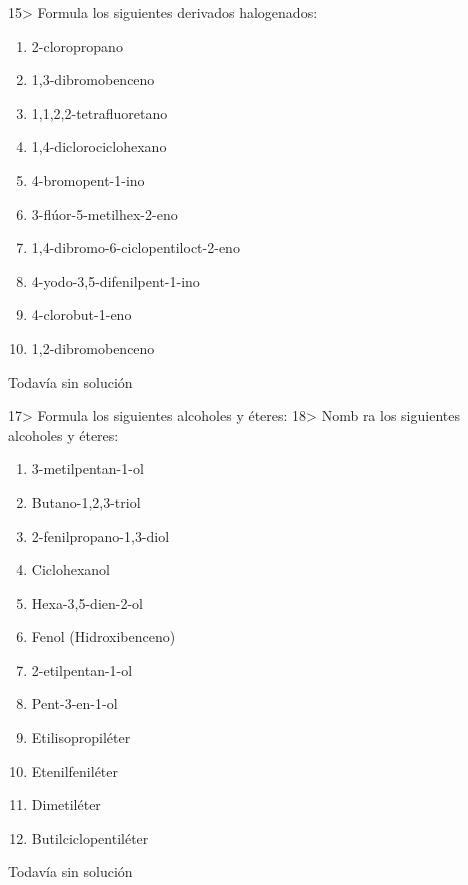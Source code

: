 \documentclass[twocolumn]{article}
\begin{document}
\begin{exercise}
  15> Formula los siguientes derivados halogenados:
  \begin{enumerate}
    \item 2-cloropropano
    \item 1,3-dibromobenceno
    \item 1,1,2,2-tetrafluoretano
    \item 1,4-diclorociclohexano
    \item 4-bromopent-1-ino
    \item 3-flúor-5-metilhex-2-eno
    \item 1,4-dibromo-6-ciclopentiloct-2-eno
    \item 4-yodo-3,5-difenilpent-1-ino
    \item 4-clorobut-1-eno
    \item 1,2-dibromobenceno
  \end{enumerate}
\end{exercise}

\begin{solution}[print=false]
  Todavía sin solución
\end{solution}

\begin{exercise}
  17> Formula los siguientes alcoholes y éteres: 18> Nomb ra los siguientes alcoholes y éteres:
  \begin{enumerate}
    \item 3-metilpentan-1-ol
    \item Butano-1,2,3-triol
    \item 2-fenilpropano-1,3-diol
    \item Ciclohexanol
    \item Hexa-3,5-dien-2-ol
    \item Fenol (Hidroxibenceno)
    \item 2-etilpentan-1-ol
    \item Pent-3-en-1-ol
    \item Etilisopropiléter
    \item Etenilfeniléter
    \item Dimetiléter
    \item Butilciclopentiléter
  \end{enumerate}
\end{exercise}

\begin{solution}[print=false]
  Todavía sin solución
\end{solution}
\end{document}
